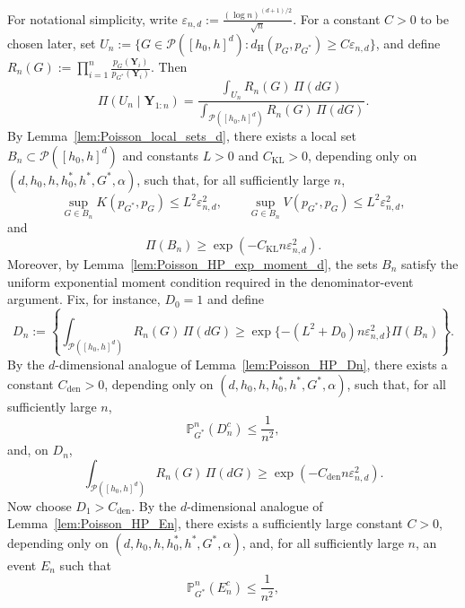 \documentclass[twoside,12pt]{article}
\renewcommand{\P}{\mathds{P}}
\begin{document}
For notational simplicity, write $\varepsilon_{n,d}:=\frac{(\log n)^{(d+1)/2}}{\sqrt n}$. For a constant $C>0$ to be chosen later, set $U_n:=\{G\in\mathcal P([h_0,h]^d):
d_{\mathrm H}(p_G,p_{G^\ast})\ge C\varepsilon_{n,d}\}$, and define $R_n(G):=\prod_{i=1}^n\frac{p_G(\boldsymbol Y_i)}{p_{G^\ast}(\boldsymbol Y_i)}$. Then
\begin{displaymath}
\Pi(U_n\mid \boldsymbol Y_{1:n})=\frac{\int_{U_n}R_n(G)\,\Pi(dG)}{\int_{\mathcal P([h_0,h]^d)}R_n(G)\,\Pi(dG)}.
\end{displaymath}
By Lemma~\ref{lem:Poisson_local_sets_d}, there exists a local set $B_n\subset\mathcal P([h_0,h]^d)$ and constants $L>0$ and $C_{\mathrm{KL}}>0$, depending only on
$(d,h_0,h,h_0^\ast,h^\ast,G^\ast,\alpha)$, such that, for all sufficiently large $n$,
\begin{displaymath}
\sup_{G\in B_n}K(p_{G^\ast},p_G)\le L^2\varepsilon_{n,d}^2,\qquad\sup_{G\in B_n}V(p_{G^\ast},p_G)\le L^2\varepsilon_{n,d}^2,
\end{displaymath}
and
\begin{displaymath}
\Pi(B_n)\ge\exp(-C_{\mathrm{KL}}n\varepsilon_{n,d}^2).
\end{displaymath}
Moreover, by Lemma~\ref{lem:Poisson_HP_exp_moment_d}, the sets $B_n$ satisfy the uniform exponential moment condition required in the denominator-event argument. Fix, for instance, $D_0=1$ and define
\begin{displaymath}
D_n:=\left\{\int_{\mathcal P([h_0,h]^d)}R_n(G)\,\Pi(dG)\ge\exp\{-(L^2+D_0)n\varepsilon_{n,d}^2\}\Pi(B_n)\right\}.
\end{displaymath}
By the $d$-dimensional analogue of Lemma~\ref{lem:Poisson_HP_Dn}, there exists a constant $C_{\mathrm{den}}>0$, depending only on $(d,h_0,h,h_0^\ast,h^\ast,G^\ast,\alpha)$, such that, for all sufficiently large $n$,
\begin{displaymath}
\P_{G^\ast}^n(D_n^c)\le \frac{1}{n^2},
\end{displaymath}
and, on $D_n$,
\begin{displaymath}
\int_{\mathcal P([h_0,h]^d)}R_n(G)\,\Pi(dG)\ge\exp(-C_{\mathrm{den}}n\varepsilon_{n,d}^2).
\end{displaymath}
Now choose $D_1>C_{\mathrm{den}}$. By the $d$-dimensional analogue of Lemma~\ref{lem:Poisson_HP_En}, there exists a sufficiently large constant $C>0$, depending only on $(d,h_0,h,h_0^\ast,h^\ast,G^\ast,\alpha)$, and, for all sufficiently large $n$, an event $E_n$ such that
\begin{displaymath}
\P_{G^\ast}^n(E_n^c)\le \frac{1}{n^2},
\end{displaymath}
\end{document}
